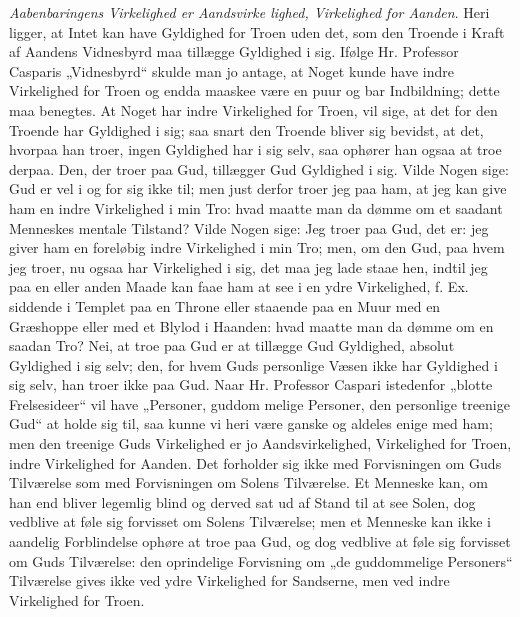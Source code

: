 \documentclass[12pt]{book}
\newcommand{\opage}[1]{\marginnote{\footnotesize\textit{[#1]}}}
\begin{document}
\emph{Aabenbaringens Virkelighed er Aandsvirke\-%
lighed, Virkelighed for Aanden}. Heri ligger, at Intet
kan have Gyldighed for Troen uden det, som den Troende
i Kraft af Aandens Vidnesbyrd maa tillægge Gyldighed i sig.
Ifølge Hr. Professor Casparis „Vidnesbyrd“ skulde man jo
antage, at Noget kunde have indre Virkelighed for Troen
og endda maaskee være en puur og bar Indbildning; dette
maa benegtes. At Noget har indre Virkelighed for Troen,
vil sige, at det for den Troende har Gyldighed i sig; saa\-%
snart den Troende bliver sig bevidst, at det, hvorpaa han
troer, ingen Gyldighed har i sig selv, saa ophører han ogsaa
at troe derpaa. Den, der troer paa Gud, tillægger Gud
Gyldighed i sig. Vilde Nogen sige: Gud er vel i og for
sig ikke til; men just derfor troer jeg paa ham, at jeg kan
give ham en indre Virkelighed i min Tro: hvad maatte man
da dømme om et saadant Menneskes mentale Tilstand? Vilde
Nogen sige: Jeg troer paa Gud, det er: jeg giver ham en
foreløbig indre Virkelighed i min Tro; men, om den Gud,
paa hvem jeg troer, nu ogsaa har Virkelighed i sig, det maa
jeg lade staae hen, indtil jeg paa en eller anden Maade kan
faae ham at see i en ydre Virkelighed, f. Ex. siddende i
Templet paa en Throne eller staaende paa en Muur med en
Græshoppe eller med et Blylod i Haanden: hvad maatte man
da dømme om en saadan Tro? Nei, at troe paa Gud er at
tillægge Gud Gyldighed, absolut Gyldighed i sig selv; den,
for hvem Guds personlige Væsen ikke har Gyldighed i sig
selv, han troer ikke paa Gud. Naar Hr. Professor Caspari
istedenfor „blotte Frelsesideer“ vil have „Personer, guddom\-%
melige Personer, den personlige treenige Gud“ at holde sig
til, saa kunne vi heri være ganske og aldeles enige med ham;
\opage{304}\setcounter{footnote}{0}%
men den treenige Guds Virkelighed er jo Aandsvirkelighed,
Virkelighed for Troen, indre Virkelighed for Aanden. Det
forholder sig ikke med Forvisningen om Guds Tilværelse
som med Forvisningen om Solens Tilværelse. Et Menneske
kan, om han end bliver legemlig blind og derved sat ud af
Stand til at see Solen, dog vedblive at føle sig forvisset om
Solens Tilværelse; men et Menneske kan ikke i aandelig
Forblindelse ophøre at troe paa Gud, og dog vedblive at føle
sig forvisset om Guds Tilværelse: den oprindelige Forvisning
om „de guddommelige Personers“ Tilværelse gives ikke ved
ydre Virkelighed for Sandserne, men ved indre Virkelighed
for Troen.
\end{document}

